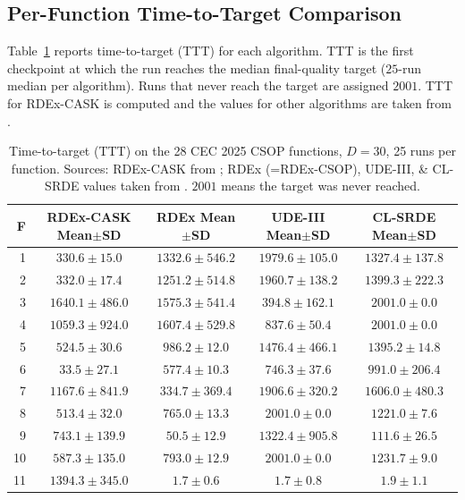 \documentclass[conference]{IEEEtran}
\begin{document}
\subsection{Per-Function Time-to-Target Comparison}
Table~\ref{tab:ttt} reports time-to-target (TTT) for each algorithm. TTT is the first checkpoint at which the run reaches the median final-quality target ($25$-run median per algorithm). Runs that never reach the target are assigned $2001$. TTT for RDEx-CASK is computed and the values for other algorithms are taken from \cite{tao2026rdex}.

\begin{table}[!t]
\centering
\caption{Time-to-target (TTT) on the 28 CEC 2025 CSOP functions, $D = 30$, 25 runs per function. Sources: RDEx-CASK from \cite{cask_results}; RDEx (=RDEx-CSOP), UDE-III, \& CL-SRDE values taken from \cite{tao2026rdex}. $2001$ means the target was never reached.}
\label{tab:ttt}
\footnotesize
\setlength{\tabcolsep}{4pt}
\begin{tabular}{rcccc}
\toprule
F & RDEx-CASK Mean$\pm$SD & RDEx Mean$\pm$SD & UDE-III Mean$\pm$SD & CL-SRDE Mean$\pm$SD \\
\midrule
1  & $\bm{330.6 \pm 15.0}$    & $1332.6 \pm 546.2$ & $1979.6 \pm 105.0$ & $1327.4 \pm 137.8$ \\
2  & $\bm{332.0 \pm 17.4}$    & $1251.2 \pm 514.8$ & $1960.7 \pm 138.2$ & $1399.3 \pm 222.3$ \\
3  & $1640.1 \pm 486.0$  & $1575.3 \pm 541.4$ & $\bm{394.8  \pm 162.1}$ & $2001.0 \pm 0.0$   \\
4  & $1059.3 \pm 924.0$  & $1607.4 \pm 529.8$ & $\bm{837.6  \pm 50.4}$  & $2001.0 \pm 0.0$   \\
5  & $\bm{524.5 \pm 30.6}$    & $986.2  \pm 12.0$  & $1476.4 \pm 466.1$ & $1395.2 \pm 14.8$  \\
6  & $\bm{33.5 \pm 27.1}$     & $577.4  \pm 10.3$  & $746.3  \pm 37.6$  & $991.0  \pm 206.4$ \\
7  & $1167.6 \pm 841.9$  & $\bm{334.7  \pm 369.4}$ & $1906.6 \pm 320.2$ & $1606.0 \pm 480.3$ \\
8  & $\bm{513.4 \pm 32.0}$    & $765.0  \pm 13.3$  & $2001.0 \pm 0.0$   & $1221.0 \pm 7.6$   \\
9  & $743.1 \pm 139.9$   & $\bm{50.5   \pm 12.9}$  & $1322.4 \pm 905.8$ & $111.6  \pm 26.5$  \\
10 & $\bm{587.3 \pm 135.0}$   & $793.0  \pm 12.9$  & $2001.0 \pm 0.0$   & $1231.7 \pm 9.0$   \\
11 & $1394.3 \pm 345.0$  & $\bm{1.7    \pm 0.6}$   & $\bm{1.7    \pm 0.8}$   & $1.9    \pm 1.1$   \\

\end{tabular}
\end{table}
\end{document}
